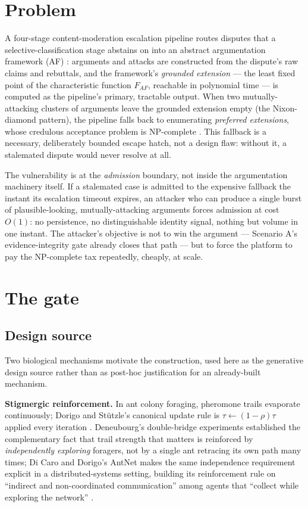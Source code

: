 \documentclass[11pt]{article}
\begin{document}
\section{Problem}
\label{sec:problem}

A four-stage content-moderation escalation pipeline routes disputes that a
selective-classification stage abstains on into an abstract argumentation framework
(AF) \cite{dung1995}: arguments and attacks are constructed from the dispute's raw
claims and rebuttals, and the framework's \emph{grounded extension} --- the
least fixed point of the characteristic function $F_{AF}$, reachable in polynomial time
--- is computed as the pipeline's primary, tractable output. When two mutually-attacking
clusters of arguments leave the grounded extension empty (the Nixon-diamond pattern),
the pipeline falls back to enumerating \emph{preferred extensions}, whose credulous
acceptance problem is NP-complete \cite{fichte2024}. This fallback is a necessary,
deliberately bounded escape hatch, not a design flaw: without it, a stalemated dispute
would never resolve at all.

The vulnerability is at the \emph{admission} boundary, not inside the argumentation
machinery itself. If a stalemated case is admitted to the expensive fallback the instant
its escalation timeout expires, an attacker who can produce a single burst of
plausible-looking, mutually-attacking arguments forces admission at cost $O(1)$: no
persistence, no distinguishable identity signal, nothing but volume in one instant. The
attacker's objective is not to win the argument --- Scenario A's evidence-integrity gate
already closes that path \cite{specA} --- but to force the platform to pay the
NP-complete tax repeatedly, cheaply, at scale.

\section{The gate}
\label{sec:gate}

\subsection{Design source}

Two biological mechanisms motivate the construction, used here as the generative
design source rather than as post-hoc justification for an already-built mechanism.

\textbf{Stigmergic reinforcement.} In ant colony foraging, pheromone trails evaporate
continuously; Dorigo and St\"utzle's canonical update rule is
$\tau \leftarrow (1-\rho)\tau$ applied every iteration \cite{dorigo2004}. Deneubourg's
double-bridge experiments established the complementary fact that trail strength that
matters is reinforced by \emph{independently exploring} foragers, not by a single ant
retracing its own path many times; Di Caro and Dorigo's AntNet makes the same
independence requirement explicit in a distributed-systems setting, building its
reinforcement rule on ``indirect and non-coordinated communication'' among agents that
``collect while exploring the network'' \cite{dicaro1998}.
\end{document}
